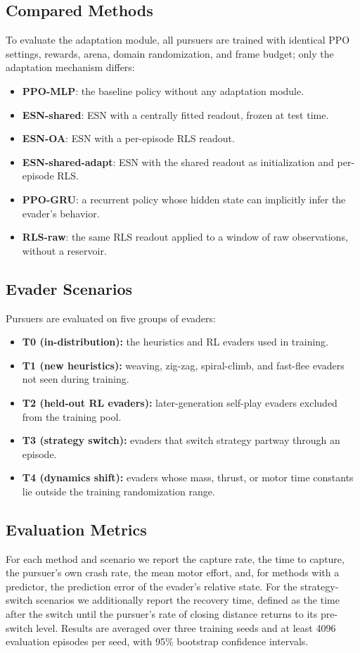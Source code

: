 \subsection{Compared Methods}
\noindent
To evaluate the adaptation module, all pursuers are trained with identical PPO settings, rewards, arena, domain randomization, and frame budget; only the adaptation mechanism differs:
\begin{itemize}
    \item \textbf{PPO-MLP}: the baseline policy without any adaptation module.
    \item \textbf{ESN-shared}: ESN with a centrally fitted readout, frozen at test time.
    \item \textbf{ESN-OA}: ESN with a per-episode RLS readout.
    \item \textbf{ESN-shared-adapt}: ESN with the shared readout as initialization and per-episode RLS.
    \item \textbf{PPO-GRU}: a recurrent policy whose hidden state can implicitly infer the evader's behavior.
    \item \textbf{RLS-raw}: the same RLS readout applied to a window of raw observations, without a reservoir.
\end{itemize}

\subsection{Evader Scenarios}
\noindent
Pursuers are evaluated on five groups of evaders:
\begin{itemize}
    \item \textbf{T0 (in-distribution):} the heuristics and RL evaders used in training.
    \item \textbf{T1 (new heuristics):} weaving, zig-zag, spiral-climb, and fast-flee evaders not seen during training.
    \item \textbf{T2 (held-out RL evaders):} later-generation self-play evaders excluded from the training pool.
    \item \textbf{T3 (strategy switch):} evaders that switch strategy partway through an episode.
    \item \textbf{T4 (dynamics shift):} evaders whose mass, thrust, or motor time constants lie outside the training randomization range.
\end{itemize}

\subsection{Evaluation Metrics}
\noindent
For each method and scenario we report the capture rate, the time to capture, the pursuer's own crash rate, the mean motor effort, and, for methods with a predictor, the prediction error of the evader's relative state. For the strategy-switch scenarios we additionally report the recovery time, defined as the time after the switch until the pursuer's rate of closing distance returns to its pre-switch level. Results are averaged over three training seeds and at least 4096 evaluation episodes per seed, with 95\% bootstrap confidence intervals.

